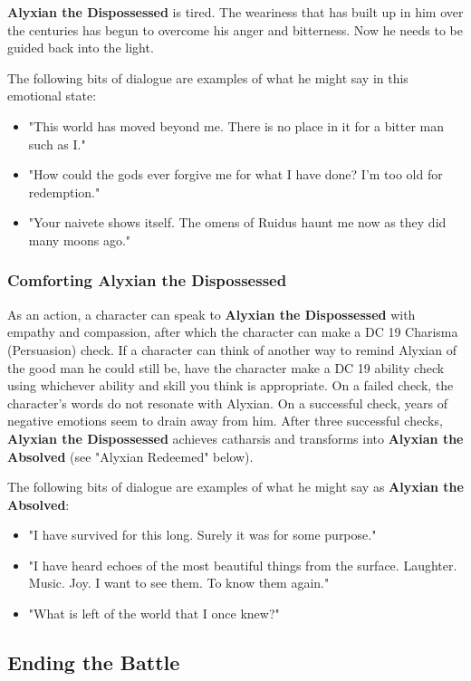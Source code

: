 \documentclass[letterpaper, 11pt, bg=full, twocolumn]{dndbook}
\begin{document}
\textbf{Alyxian the Dispossessed} is tired. The weariness that has built up in him over the centuries has begun to overcome his anger and bitterness. Now he needs to be guided back into the light.

The following bits of dialogue are examples of what he might say in this emotional state:

\begin{itemize}
\item "This world has moved beyond me. There is no place in it for a bitter man such as I."
\item "How could the gods ever forgive me for what I have done? I'm too old for redemption."
\item "Your naivete shows itself. The omens of Ruidus haunt me now as they did many moons ago."
\end{itemize}

\subsubsection{Comforting Alyxian the Dispossessed}

As an action, a character can speak to \textbf{Alyxian the Dispossessed} with empathy and compassion, after which the character can make a DC 19 Charisma (Persuasion) check. If a character can think of another way to remind Alyxian of the good man he could still be, have the character make a DC 19 ability check using whichever ability and skill you think is appropriate. On a failed check, the character's words do not resonate with Alyxian. On a successful check, years of negative emotions seem to drain away from him. After three successful checks, \textbf{Alyxian the Dispossessed} achieves catharsis and transforms into \textbf{Alyxian the Absolved} (see "Alyxian Redeemed" below).

The following bits of dialogue are examples of what he might say as \textbf{Alyxian the Absolved}:

\begin{itemize}
\item "I have survived for this long. Surely it was for some purpose."
\item "I have heard echoes of the most beautiful things from the surface. Laughter. Music. Joy. I want to see them. To know them again."
\item "What is left of the world that I once knew?"
\end{itemize}

\subsection{Ending the Battle}
\end{document}
